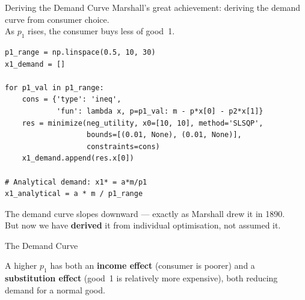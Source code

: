 \documentclass[aspectratio=169, 10pt]{beamer}
\begin{document}
\begin{frame}[fragile]{Deriving the Demand Curve}
Marshall's great achievement: deriving the demand curve from consumer choice.\\
As $p_1$ rises, the consumer buys less of good~1.
\begin{lstlisting}
p1_range = np.linspace(0.5, 10, 30)
x1_demand = []

for p1_val in p1_range:
    cons = {'type': 'ineq',
            'fun': lambda x, p=p1_val: m - p*x[0] - p2*x[1]}
    res = minimize(neg_utility, x0=[10, 10], method='SLSQP',
                   bounds=[(0.01, None), (0.01, None)],
                   constraints=cons)
    x1_demand.append(res.x[0])

# Analytical demand: x1* = a*m/p1
x1_analytical = a * m / p1_range
\end{lstlisting}
\vspace{0.3em}
The demand curve slopes downward --- exactly as Marshall drew it in 1890.\\
But now we have \textbf{derived} it from individual optimisation, not assumed it.
\end{frame}

\begin{frame}{The Demand Curve}
\begin{center}
\end{center}
\vspace{0.3em}
A higher $p_1$ has both an \textbf{income effect} (consumer is poorer)
and a \textbf{substitution effect} (good~1 is relatively more expensive),
both reducing demand for a normal good.
\end{frame}
\end{document}
